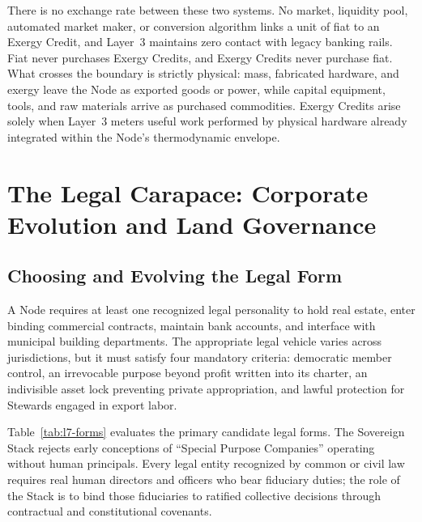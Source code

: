 There is no exchange rate between these two systems. No market, liquidity pool, automated market maker, or conversion algorithm links a unit of fiat to an Exergy Credit, and Layer~3 maintains zero contact with legacy banking rails. Fiat never purchases Exergy Credits, and Exergy Credits never purchase fiat. What crosses the boundary is strictly physical: mass, fabricated hardware, and exergy leave the Node as exported goods or power, while capital equipment, tools, and raw materials arrive as purchased commodities. Exergy Credits arise solely when Layer~3 meters useful work performed by physical hardware already integrated within the Node's thermodynamic envelope.

\section{The Legal Carapace: Corporate Evolution and Land Governance}

\subsection{Choosing and Evolving the Legal Form}

A Node requires at least one recognized legal personality to hold real estate, enter binding commercial contracts, maintain bank accounts, and interface with municipal building departments. The appropriate legal vehicle varies across jurisdictions, but it must satisfy four mandatory criteria: democratic member control, an irrevocable purpose beyond profit written into its charter, an indivisible asset lock preventing private appropriation, and lawful protection for Stewards engaged in export labor.

Table~\ref{tab:l7-forms} evaluates the primary candidate legal forms. The Sovereign Stack rejects early conceptions of ``Special Purpose Companies'' operating without human principals. Every legal entity recognized by common or civil law requires real human directors and officers who bear fiduciary duties; the role of the Stack is to bind those fiduciaries to ratified collective decisions through contractual and constitutional covenants.

